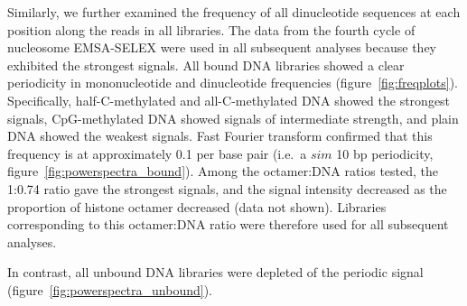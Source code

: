 \documentclass[a4paper, numbers=noenddot]{scrbook}
\begin{document}
Similarly, we further examined the frequency of all dinucleotide sequences at each position along the reads in all libraries.  The data from the fourth cycle of nucleosome EMSA-SELEX were used in all subsequent analyses because they exhibited the strongest signals.  All bound DNA libraries showed a clear periodicity in mononucleotide and dinucleotide frequencies (figure~\ref{fig:freqplots}).  Specifically, half-C-methylated and all-C-methylated DNA showed the strongest signals, CpG-methylated DNA showed signals of intermediate strength, and plain DNA showed the weakest signals.  Fast Fourier transform confirmed that this frequency is at approximately 0.1 per base pair (i.e.\ a $sim$ 10 bp periodicity, figure~\ref{fig:powerspectra_bound}).  Among the octamer:DNA ratios tested, the 1:0.74 ratio gave the strongest signals, and the signal intensity decreased as the proportion of histone octamer decreased (data not shown).  Libraries corresponding to this octamer:DNA ratio were therefore used for all subsequent analyses.

In contrast, all unbound DNA libraries were depleted of the periodic signal (figure~\ref{fig:powerspectra_unbound}).
\end{document}
